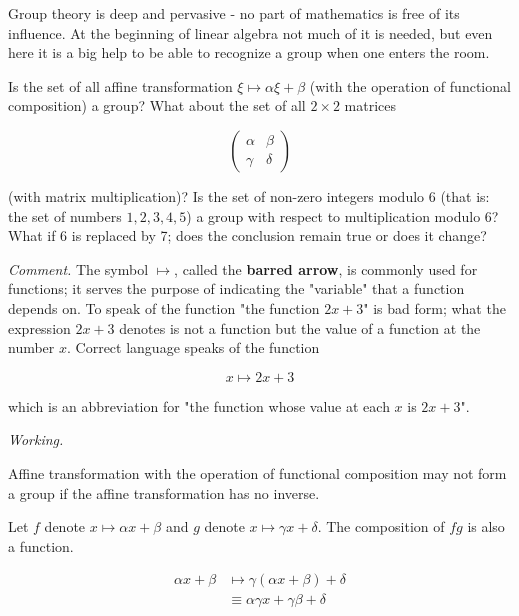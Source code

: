 Group theory is deep and pervasive - no part of mathematics is free of its influence. At the beginning of linear algebra not much of it is needed, but even here it is a big help to be able to recognize a group when one enters the room.

\begin{problem}
Is the set of all affine transformation $\xi \mapsto \alpha\xi + \beta$ (with the operation of functional composition) a group? What about the set of all $2 \times 2$ matrices

\[
    \begin{pmatrix}
        \alpha & \beta  \\
        \gamma & \delta
    \end{pmatrix}
\]

(with matrix multiplication)? Is the set of non-zero integers modulo 6 (that is: the set of numbers $1,2,3,4,5$) a group with respect to multiplication modulo 6? What if 6 is replaced by 7; does the conclusion remain true or does it change?
\end{problem}

\textit{Comment.} The symbol $\mapsto$, called the \textbf{barred arrow}, is commonly used for functions; it serves the purpose of indicating the "variable" that a function depends on. To speak of the function "the function $2x+3$" is bad form; what the expression $2x+3$ denotes is not a function but the value of a function at the number $x$. Correct language speaks of the function

\begin{equation}
    x \mapsto 2x + 3
\end{equation}

which is an abbreviation for "the function whose value at each $x$ is $2x+3$".

\textit{Working.}

Affine transformation with the operation of functional composition may not form a group if the affine transformation has no inverse.

Let $f$ denote $x \mapsto \alpha x + \beta$ and $g$ denote $x \mapsto \gamma x + \delta$. The composition of $f g$ is also a function.

\begin{align}
    \alpha x + \beta & \mapsto \gamma (\alpha x + \beta) + \delta     \\
                     & \equiv \alpha \gamma x + \gamma \beta + \delta
\end{align}

